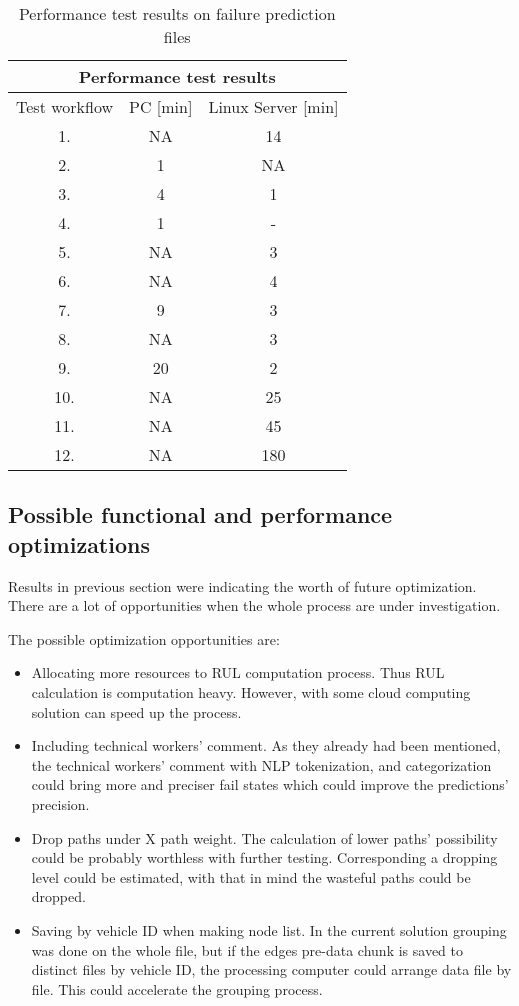 \begin{table}[H]
\centering
\begin{tabular}{ |c|c|c|  }
\hline
\multicolumn{3}{|c|}{Performance test results} \\
\hline
Test workflow& PC [min] & Linux Server [min]\\
\hline
1.& NA & 14 \\
2.& 1 & NA \\
3.& 4 & 1 \\
4.& 1 & - \\
5.& NA & 3 \\
6.& NA & 4 \\
7.& 9 & 3 \\
8.& NA & 3 \\
9.& 20 & 2 \\
10.& NA & 25 \\
11.& NA & 45 \\
12.& NA & 180 \\
\hline
\end{tabular}
\caption{Performance test results on failure prediction files}
\label{table:3}
\end{table}
\subsection{Possible functional and performance optimizations}
Results in previous section were indicating the worth of future optimization. There are a lot of opportunities when the whole process are under investigation.

The possible optimization opportunities are:
\begin{itemize}
	\item{Allocating more resources to RUL computation process.} Thus RUL calculation is computation heavy. However, with some cloud computing solution can speed up the process.
	\item{Including technical workers' comment.} As they already had been mentioned, the technical workers' comment with NLP tokenization, and categorization could bring more and preciser fail states which could improve the predictions' precision.
	\item{Drop paths under X path weight.} The calculation of lower paths' possibility could be probably worthless with further testing. Corresponding a dropping level could be estimated, with that in mind the wasteful paths could be dropped.
	\item{Saving by vehicle ID when making node list.} In the current solution grouping was done on the whole file, but if the edges pre-data chunk is saved to distinct files by vehicle ID, the processing computer could arrange data file by file. This could accelerate the grouping process.
\end{itemize} 
